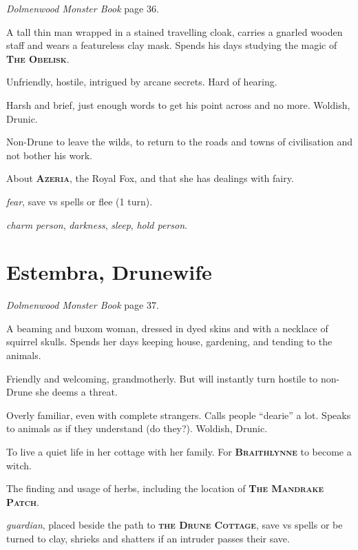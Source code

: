 \documentclass[10pt]{article}
\newcommand\locationcolour{Mahogany}
\newcommand\npccolour{CornflowerBlue}
\newcommand{\keyword}[1]{\textsc{\textbf{#1}}}
\newcommand{\location}[1]{\keyword{\color{\locationcolour}#1}}
\newcommand{\npc}[1]{\keyword{\color{\npccolour}#1}}
\begin{document}
\begin{multicols*}{2}
\emph{Dolmenwood Monster Book} page 36.

A tall thin man wrapped in a stained travelling cloak, carries a
gnarled wooden staff and wears a featureless clay mask.  Spends his
days studying the magic of \location{The Obelisk}.

\begin{description}[leftmargin=!,labelwidth=\widthof{\bfseries Demeanour}]
\item[Demeanour] Unfriendly, hostile, intrigued by arcane secrets.
  Hard of hearing.
\item[Speech] Harsh and brief, just enough words to get his point
  across and no more.  Woldish, Drunic.
\item[Wants] Non-Drune to leave the wilds, to return to the roads and
  towns of civilisation and not bother his work.
\item[Knows] About \npc{Azeria}, the Royal Fox, and that she has
  dealings with fairy.
\item[Sigil] \emph{fear}, save vs spells or flee (1 turn).
\item[Spells] \emph{charm person}, \emph{darkness}, \emph{sleep},
  \emph{hold person}.
\end{description}

\section*{Estembra, Drunewife}

\emph{Dolmenwood Monster Book} page 37.

A beaming and buxom woman, dressed in dyed skins and with a necklace
of squirrel skulls.  Spends her days keeping house, gardening, and
tending to the animals.

\begin{description}[leftmargin=!,labelwidth=\widthof{\bfseries Demeanour}]
\item[Demeanour] Friendly and welcoming, grandmotherly.  But will
  instantly turn hostile to non-Drune she deems a threat.
\item[Speech] Overly familiar, even with complete strangers.  Calls
  people ``dearie'' a lot.  Speaks to animals as if they understand
  (do they?).  Woldish, Drunic.
\item[Wants] To live a quiet life in her cottage with her family.  For
  \npc{Braithlynne} to become a witch.
\item[Knows] The finding and usage of herbs, including the location of
  \location{The Mandrake Patch}.
\item[Kilnling] \emph{guardian}, placed beside the path to
  \location{the Drune Cottage}, save vs spells or be turned to clay,
  shrieks and shatters if an intruder passes their save.
\end{description}


\end{multicols*}
\end{document}
